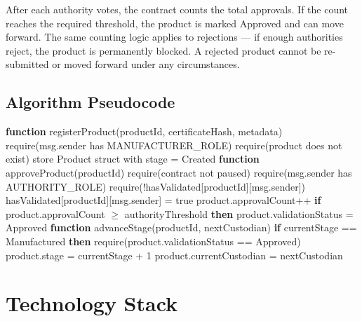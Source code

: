 \documentclass[conference]{IEEEtran}
\begin{document}
After each authority votes, the contract counts the total approvals. If the count reaches the required threshold, the product is marked Approved and can move forward. The same counting logic applies to rejections --- if enough authorities reject, the product is permanently blocked. A rejected product cannot be re-submitted or moved forward under any circumstances.

\subsection{Algorithm Pseudocode}

\begin{algorithmic}
\STATE \textbf{function} registerProduct(productId, certificateHash, metadata)
\STATE \hspace{1em} require(msg.sender has MANUFACTURER\_ROLE)
\STATE \hspace{1em} require(product does not exist)
\STATE \hspace{1em} store Product struct with stage = Created
\STATE \textbf{function} approveProduct(productId)
\STATE \hspace{1em} require(contract not paused)
\STATE \hspace{1em} require(msg.sender has AUTHORITY\_ROLE)
\STATE \hspace{1em} require(!hasValidated[productId][msg.sender])
\STATE \hspace{1em} hasValidated[productId][msg.sender] = true
\STATE \hspace{1em} product.approvalCount++
\STATE \hspace{1em} \textbf{if} product.approvalCount $\geq$ authorityThreshold \textbf{then}
\STATE \hspace{2em} product.validationStatus = Approved
\STATE \textbf{function} advanceStage(productId, nextCustodian)
\STATE \hspace{1em} \textbf{if} currentStage == Manufactured \textbf{then}
\STATE \hspace{2em} require(product.validationStatus == Approved)
\STATE \hspace{1em} product.stage = currentStage + 1
\STATE \hspace{1em} product.currentCustodian = nextCustodian
\end{algorithmic}

\section{Technology Stack}
\end{document}
